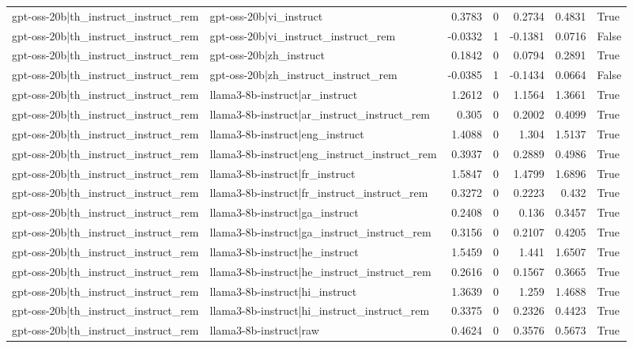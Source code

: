 \begin{table}
\begin{tabular}{l l r r r r l}
gpt-oss-20b|th_instruct_instruct_rem & gpt-oss-20b|vi_instruct & 0.3783 & 0 & 0.2734 & 0.4831 & True \\
gpt-oss-20b|th_instruct_instruct_rem & gpt-oss-20b|vi_instruct_instruct_rem & -0.0332 & 1 & -0.1381 & 0.0716 & False \\
gpt-oss-20b|th_instruct_instruct_rem & gpt-oss-20b|zh_instruct & 0.1842 & 0 & 0.0794 & 0.2891 & True \\
gpt-oss-20b|th_instruct_instruct_rem & gpt-oss-20b|zh_instruct_instruct_rem & -0.0385 & 1 & -0.1434 & 0.0664 & False \\
gpt-oss-20b|th_instruct_instruct_rem & llama3-8b-instruct|ar_instruct & 1.2612 & 0 & 1.1564 & 1.3661 & True \\
gpt-oss-20b|th_instruct_instruct_rem & llama3-8b-instruct|ar_instruct_instruct_rem & 0.305 & 0 & 0.2002 & 0.4099 & True \\
gpt-oss-20b|th_instruct_instruct_rem & llama3-8b-instruct|eng_instruct & 1.4088 & 0 & 1.304 & 1.5137 & True \\
gpt-oss-20b|th_instruct_instruct_rem & llama3-8b-instruct|eng_instruct_instruct_rem & 0.3937 & 0 & 0.2889 & 0.4986 & True \\
gpt-oss-20b|th_instruct_instruct_rem & llama3-8b-instruct|fr_instruct & 1.5847 & 0 & 1.4799 & 1.6896 & True \\
gpt-oss-20b|th_instruct_instruct_rem & llama3-8b-instruct|fr_instruct_instruct_rem & 0.3272 & 0 & 0.2223 & 0.432 & True \\
gpt-oss-20b|th_instruct_instruct_rem & llama3-8b-instruct|ga_instruct & 0.2408 & 0 & 0.136 & 0.3457 & True \\
gpt-oss-20b|th_instruct_instruct_rem & llama3-8b-instruct|ga_instruct_instruct_rem & 0.3156 & 0 & 0.2107 & 0.4205 & True \\
gpt-oss-20b|th_instruct_instruct_rem & llama3-8b-instruct|he_instruct & 1.5459 & 0 & 1.441 & 1.6507 & True \\
gpt-oss-20b|th_instruct_instruct_rem & llama3-8b-instruct|he_instruct_instruct_rem & 0.2616 & 0 & 0.1567 & 0.3665 & True \\
gpt-oss-20b|th_instruct_instruct_rem & llama3-8b-instruct|hi_instruct & 1.3639 & 0 & 1.259 & 1.4688 & True \\
gpt-oss-20b|th_instruct_instruct_rem & llama3-8b-instruct|hi_instruct_instruct_rem & 0.3375 & 0 & 0.2326 & 0.4423 & True \\
gpt-oss-20b|th_instruct_instruct_rem & llama3-8b-instruct|raw & 0.4624 & 0 & 0.3576 & 0.5673 & True \\

\end{tabular}
\end{table}
